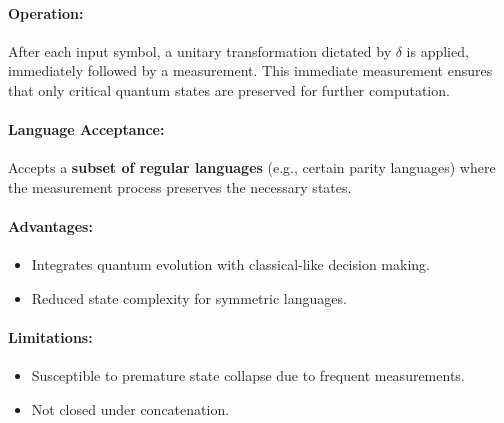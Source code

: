 \paragraph{Operation:}  
After each input symbol, a unitary transformation dictated by \( \delta \) is applied, immediately followed by a measurement. This immediate measurement ensures that only critical quantum states are preserved for further computation.

\paragraph{Language Acceptance:}  
Accepts a \textbf{subset of regular languages} (e.g., certain parity languages) where the measurement process preserves the necessary states.

\paragraph{Advantages:}
\begin{itemize}
    \item Integrates quantum evolution with classical-like decision making.
    \item Reduced state complexity for symmetric languages.
\end{itemize}

\paragraph{Limitations:}
\begin{itemize}
    \item Susceptible to premature state collapse due to frequent measurements.
    \item Not closed under concatenation.
\end{itemize}

